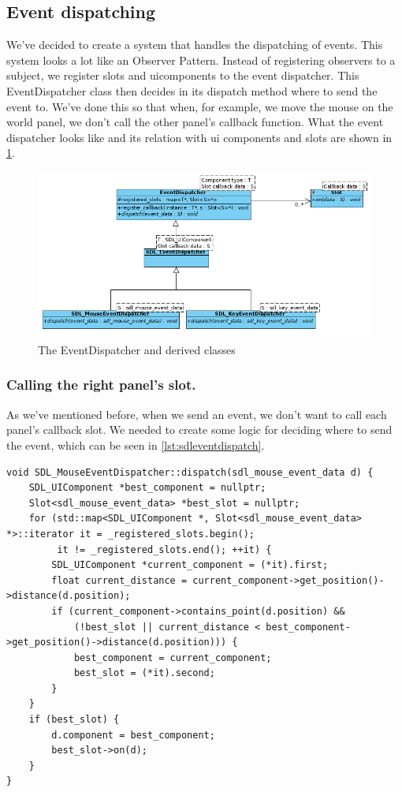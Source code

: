 \subsection{Event dispatching}
\label{sec:eventdispatch}
We've decided to create a system that handles the dispatching of events. This 
system looks a lot like an Observer Pattern. Instead of registering observers 
to a subject, we register slots and uicomponents to the event dispatcher.
This EventDispatcher class then decides in its dispatch method where to send 
the event to. We've done this so that when, for example, we move the mouse 
on the world panel, we don't call the other panel's callback function.
What the event dispatcher looks like and its relation with ui components and 
slots are shown in \cref{fig:eventdispatcher}.

\begin{figure}[H]
\centering
\includegraphics[scale=0.6]{res/events/eventdispatch.png}
\caption{The EventDispatcher and derived classes}\label{fig:eventdispatcher}
\end{figure}

\subsubsection{Calling the right panel's slot.}
\label{sec:eventdispatcher-dispatch}
As we've mentioned before, when we send an event, we don't want to call each 
panel's callback slot. We needed to create some logic for deciding where to 
send the event, which can be seen in \cref{lst:sdleventdispatch}.
\\

\begin{lstlisting}[caption={SDL\_MouseEventDispatcher dispatch method.},
label={lst:sdleventdispatch}]
void SDL_MouseEventDispatcher::dispatch(sdl_mouse_event_data d) {
    SDL_UIComponent *best_component = nullptr;
    Slot<sdl_mouse_event_data> *best_slot = nullptr;
    for (std::map<SDL_UIComponent *, Slot<sdl_mouse_event_data> *>::iterator it = _registered_slots.begin();
         it != _registered_slots.end(); ++it) {
        SDL_UIComponent *current_component = (*it).first;
        float current_distance = current_component->get_position()->distance(d.position);
        if (current_component->contains_point(d.position) &&
            (!best_slot || current_distance < best_component->get_position()->distance(d.position))) {
            best_component = current_component;
            best_slot = (*it).second;
        }
    }
    if (best_slot) {
        d.component = best_component;
        best_slot->on(d);
    }
}
\end{lstlisting}

